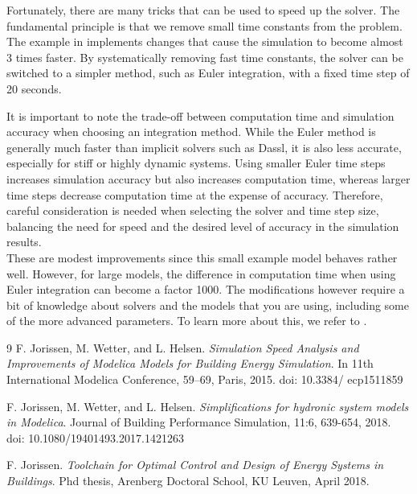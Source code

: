 \documentclass[10pt,a4paper]{article}
\begin{document}
Fortunately, there are many tricks that can be used to speed up the solver. 
The fundamental principle is that we remove small time constants from the problem.
The example in  implements changes that
cause the simulation to become almost 3 times faster.
By systematically removing fast time constants, the solver can be switched to a simpler method, 
such as Euler integration, with a fixed time step of 20 seconds.

It is important to note the trade-off between computation time and simulation 
accuracy when choosing an integration method. While the Euler method is generally 
much faster than implicit solvers such as Dassl, it is also less accurate, 
especially for stiff or highly dynamic systems. Using smaller Euler time steps 
increases simulation accuracy but also increases computation time, whereas larger
time steps decrease computation time at the expense of accuracy. Therefore, careful
consideration is needed when selecting the solver and time step size, balancing 
the need for speed and the desired level of accuracy in the simulation results.\\ 

These are modest improvements since this small example model behaves rather well.
However, for large models, the difference in computation time 
when using Euler integration can become a factor 1000.
The modifications however require a bit of knowledge about solvers 
and the models that you are using, including some of the more advanced parameters.
To learn more about this, we refer to \cite{Jorissen2015,Jorissen2018,phd}.

\vfill

\begin{thebibliography}{9}
F. Jorissen, M. Wetter, and L. Helsen. \textit{Simulation Speed Analysis and Improvements of Modelica Models for Building Energy Simulation}. In 11th International Modelica Conference, 59–69, Paris, 2015. doi: 10.3384/ ecp1511859

F. Jorissen, M. Wetter, and L. Helsen. \textit{Simplifications for hydronic system models in Modelica}. Journal of Building Performance Simulation, 11:6, 639-654, 2018. doi: 10.1080/19401493.2017.1421263

F. Jorissen. \textit{Toolchain for Optimal Control and Design of Energy Systems in Buildings}. Phd thesis, Arenberg Doctoral School, KU Leuven, April 2018.

\end{thebibliography}
\end{document}
